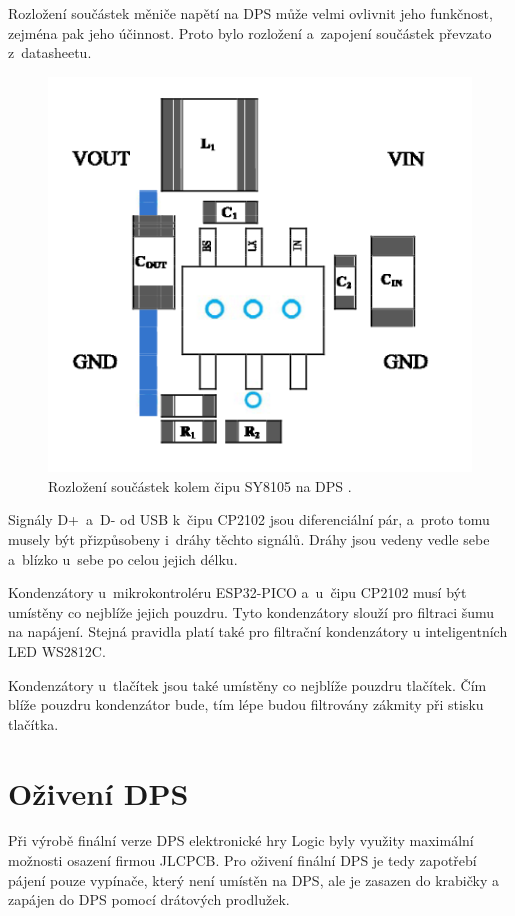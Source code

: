   Rozložení součástek měniče napětí na DPS může velmi ovlivnit jeho funkčnost, zejména pak jeho účinnost. Proto bylo rozložení a~zapojení součástek 
  převzato z~datasheetu.

  \begin{figure}[!h]
    \begin{center}
      \includegraphics[scale=1]{obrazky/SY8105_rozlozeni_na_DPS.png}
    \end{center}
    \caption[Rozložení součástek kolem čipu SY8105 na DPS \cite{SY8105_datasheet}]{Rozložení součástek kolem čipu SY8105 na DPS 
    \cite{SY8105_datasheet}.}
  \end{figure}

  Signály D+~a~D- od USB k~čipu CP2102 jsou diferenciální pár, a~proto tomu musely být přizpůsobeny i~dráhy těchto signálů. Dráhy 
  jsou vedeny vedle sebe a~blízko u~sebe po celou jejich délku.

  Kondenzátory u~mikrokontroléru ESP32-PICO a~u~čipu CP2102 musí být umístěny co nejblíže jejich pouzdru. Tyto kondenzátory slouží pro 
  filtraci šumu na napájení. Stejná pravidla platí také pro filtrační kondenzátory u inteligentních LED WS2812C.

  Kondenzátory u~tlačítek jsou také umístěny co nejblíže pouzdru tlačítek. Čím blíže pouzdru kondenzátor bude, tím lépe budou 
  filtrovány zákmity při stisku tlačítka.

  \chapter{Oživení DPS}
  Při výrobě finální verze DPS elektronické hry Logic byly využity maximální možnosti osazení firmou JLCPCB.  
  Pro oživení finální DPS je tedy zapotřebí pájení pouze vypínače, který není umístěn na DPS, ale je zasazen do krabičky a zapájen
  do DPS pomocí drátových prodlužek. 

